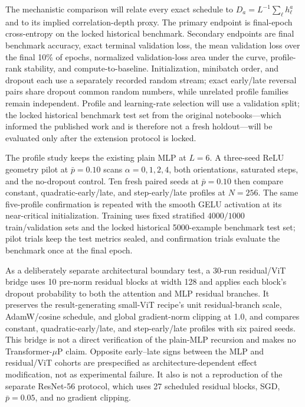 The mechanistic comparison will relate every exact schedule to \(D_a=L^{-1}\sum_\ell h_\ell^a\) and to its implied correlation-depth proxy. The primary endpoint is final-epoch cross-entropy on the locked historical benchmark. Secondary endpoints are final benchmark accuracy, exact terminal validation loss, the mean validation loss over the final 10\% of epochs, normalized validation-loss area under the curve, profile-rank stability, and compute-to-baseline. Initialization, minibatch order, and dropout each use a separately recorded random stream; exact early/late reversal pairs share dropout common random numbers, while unrelated profile families remain independent. Profile and learning-rate selection will use a validation split; the locked historical benchmark test set from the original notebooks---which informed the published work and is therefore not a fresh holdout---will be evaluated only after the extension protocol is locked.

The profile study keeps the existing plain MLP at \(L=6\). A three-seed ReLU geometry pilot at \(\bar p=0.10\) scans \(\alpha=0,1,2,4\), both orientations, saturated steps, and the no-dropout control. Ten fresh paired seeds at \(\bar p=0.10\) then compare constant, quadratic-early/late, and step-early/late profiles at \(N=256\). The same five-profile confirmation is repeated with the smooth GELU activation at its near-critical initialization. Training uses fixed stratified \(4000/1000\) train/validation sets and the locked historical 5000-example benchmark test set; pilot trials keep the test metrics sealed, and confirmation trials evaluate the benchmark once at the final epoch.

As a deliberately separate architectural boundary test, a 30-run residual/ViT bridge uses 10 pre-norm residual blocks at width 128 and applies each block's dropout probability to both the attention and MLP residual branches. It preserves the result-generating small-ViT recipe's unit residual-branch scale, AdamW/cosine schedule, and global gradient-norm clipping at 1.0, and compares constant, quadratic-early/late, and step-early/late profiles with six paired seeds. This bridge is not a direct verification of the plain-MLP recursion and makes no Transformer-\(\mu\)P claim. Opposite early--late signs between the MLP and residual/ViT cohorts are prespecified as architecture-dependent effect modification, not as experimental failure. It also is not a reproduction of the separate ResNet-56 protocol, which uses 27 scheduled residual blocks, SGD, \(\bar p=0.05\), and no gradient clipping.

